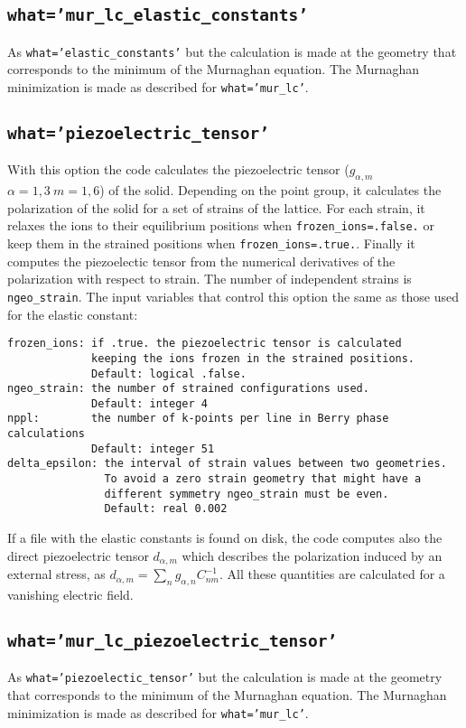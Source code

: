\documentclass[12pt,a4paper]{article}
\begin{document}
\subsection{\texttt{what='mur\_lc\_elastic\_constants'}}
As \texttt{what='elastic\_constants'} but the calculation is made at the
geometry that corresponds to the minimum of the Murnaghan equation. The
Murnaghan minimization is made as described for \texttt{what='mur\_lc'}.

\subsection{\texttt{what='piezoelectric\_tensor'}}
With this option the code calculates the piezoelectric tensor 
($g_{\alpha,m}$ $\alpha=1,3\ m=1,6$) of the solid.
Depending on the point group, it calculates the polarization of the
solid for a set of strains of the lattice. For each strain, it relaxes 
the ions to their equilibrium positions when \texttt{frozen\_ions=.false.} 
or keep them in the strained positions when \texttt{frozen\_ions=.true.}. 
Finally it computes the piezoelectic tensor from the numerical derivatives 
of the polarization with respect to strain.
The number of independent strains is \texttt{ngeo\_strain}. The input variables
that control this option the same as those used for the elastic constant:
\begin{verbatim}
frozen_ions: if .true. the piezoelectric tensor is calculated 
             keeping the ions frozen in the strained positions. 
             Default: logical .false.
ngeo_strain: the number of strained configurations used. 
             Default: integer 4
nppl:        the number of k-points per line in Berry phase calculations
             Default: integer 51
delta_epsilon: the interval of strain values between two geometries.
               To avoid a zero strain geometry that might have a
               different symmetry ngeo_strain must be even.
               Default: real 0.002
\end{verbatim}
If a file with the elastic constants is found on disk, the code computes also
the direct piezoelectric tensor $d_{\alpha,m}$ which describes
the polarization induced by an external stress, as $d_{\alpha,m}=
\sum_n g_{\alpha,n} C_{nm}^{-1}$. All these quantities are calculated 
for a vanishing electric field.

\subsection{\texttt{what='mur\_lc\_piezoelectric\_tensor'}}
As \texttt{what='piezoelectic\_tensor'} but the calculation is made at the
geometry that corresponds to the minimum of the Murnaghan equation. The
Murnaghan minimization is made as described for \texttt{what='mur\_lc'}.
\end{document}
